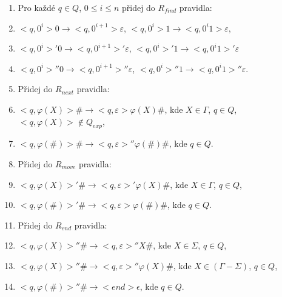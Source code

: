 \begin{Alg}
\begin{list}{}{\setlength\parsep{0cm} \setlength\itemsep{0cm} \setlength\leftmargin{1em}}
\begin{enumerate}

  \item Pro každé $q \in Q$, $0 \le i \le n$ přidej do $R_{find}$ pravidla:

\renewcommand{\labelenumi}{(\roman{enumi})}

  \item $<q, 0^i> 0 \rightarrow <q, 0^{i+1}> \varepsilon $, $<q, 0^i> 1 \rightarrow <q, 0^i 1> \varepsilon $,
  \item $<q, 0^i>' 0 \rightarrow <q, 0^{i+1}>' \varepsilon $, $<q, 0^i>' 1 \rightarrow <q, 0^i 1>' \varepsilon $
  \item $<q, 0^i>'' 0 \rightarrow <q, 0^{i+1}>'' \varepsilon $, $<q, 0^i>'' 1 \rightarrow <q, 0^i 1>'' \varepsilon $.



  \item Přidej do $R_{next}$ pravidla:

\renewcommand{\labelenumi}{(\roman{enumi})}

  \item $<q, \varphi(X)> \# \rightarrow <q, \varepsilon> \varphi(X) \# $, kde $X \in \Gamma$, $q \in Q$, $<q, \varphi(X)> \notin Q_{exp}$,
  \item $<q, \varphi(\#) > \# \rightarrow <q, \varepsilon>'' \varphi(\#) \# $, kde $q \in Q$.


  \item Přidej do $R_{move}$ pravidla:

\renewcommand{\labelenumi}{(\roman{enumi})}

  \item $<q, \varphi(X)>' \# \rightarrow <q, \varepsilon>' \varphi(X) \# $, kde $X \in \Gamma$, $q \in Q$,
  \item $<q, \varphi(\#) >' \# \rightarrow <q, \varepsilon> \varphi(\#) \# $, kde $q \in Q$.


  \item Přidej do $R_{end}$ pravidla:

\renewcommand{\labelenumi}{(\roman{enumi})}

  \item $<q, \varphi(X) >'' \# \rightarrow <q, \varepsilon>'' X \# $, kde $X \in \Sigma$, $q \in Q$,
  \item $<q, \varphi(X) >'' \# \rightarrow <q, \varepsilon>'' \varphi(X) \# $, kde $X \in (\Gamma - \Sigma)$, $q \in Q$,
  \item $<q, \varphi(\#) >'' \# \rightarrow <end> \epsilon $, kde $q \in Q$.

\end{enumerate}

\end{list}
\end{Alg}



